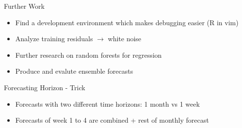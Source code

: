 \documentclass{beamer}
\begin{document}
\begin{frame}{Further Work}
\begin{itemize}
\item Find a development environment which makes debugging easier (R in vim)
\pause
\item Analyze training residuals \pause $\rightarrow$ white noise
\pause
\item Further research on random forests for regression
\pause
\item Produce and evalute ensemble forecasts
\end{itemize}
\end{frame}

\appendix
{}
\setcounter{finalframe}{\value{framenumber}}
\setcounter{framenumber}{\value{finalframe}}


\begin{frame}{Forecasting Horizon - Trick}
\begin{itemize}
\item Forecasts with two different time horizons: 1 month vs 1 week
\item Forecasts of week 1 to 4 are combined + rest of monthly forecast 
\end{itemize}
\begin{figure}
\centering
\hspace*{-1.5em}
\end{figure}
\end{frame}
\end{document}
